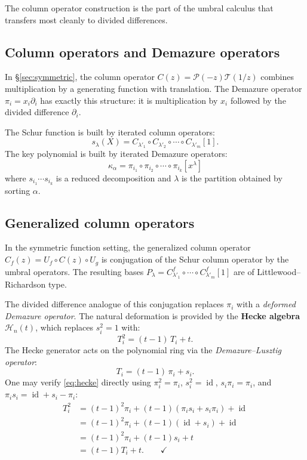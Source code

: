 \documentclass[11pt]{amsart}
\theoremstyle{definition}
\newcommand{\cT}{\mathcal{T}}
\newcommand{\cP}{\mathcal{P}}
\newcommand{\cH}{\mathcal{H}}
\DeclareMathOperator{\id}{id}
\begin{document}
The column operator construction is the part of the umbral calculus
that transfers most cleanly to divided differences.

\subsection{Column operators and Demazure operators}

In \S\ref{sec:symmetric}, the column operator $C(z) = \cP(-z)\cT(1/z)$
combines multiplication by a generating function with translation.
The Demazure operator $\pi_i = x_i \partial_i$ has exactly this
structure: it is multiplication by $x_i$ followed by the divided
difference $\partial_i$.

The Schur function is built by iterated column operators:
\[
  s_\lambda(X) = C_{\lambda'_1} \circ C_{\lambda'_2} \circ \cdots
  \circ C_{\lambda'_m}[1].
\]
The key polynomial is built by iterated Demazure operators:
\[
  \kappa_\alpha = \pi_{i_1} \circ \pi_{i_2} \circ \cdots \circ
  \pi_{i_k}[x^\lambda]
\]
where $s_{i_1} \cdots s_{i_k}$ is a reduced decomposition and
$\lambda$ is the partition obtained by sorting $\alpha$.

\subsection{Generalized column operators}

In the symmetric function setting, the generalized column operator
$C_f(z) = U_f \circ C(z) \circ U_g$ is conjugation of the Schur
column operator by the umbral operators. The resulting bases
$P_\lambda = C^f_{\lambda'_1} \circ \cdots \circ C^f_{\lambda'_m}[1]$
are of Littlewood--Richardson type.

The divided difference analogue of this conjugation replaces $\pi_i$
with a \emph{deformed Demazure operator}. The natural deformation
is provided by the \textbf{Hecke algebra} $\cH_n(t)$, which
replaces $s_i^2 = 1$ with:
\begin{equation}\label{eq:hecke}
  T_i^2 = (t - 1)\, T_i + t.
\end{equation}
The Hecke generator acts on the polynomial ring via the
\emph{Demazure--Lusztig operator}:
\begin{equation}\label{eq:DL}
  T_i = (t - 1)\, \pi_i + s_i.
\end{equation}
One may verify \eqref{eq:hecke} directly using $\pi_i^2 = \pi_i$,
$s_i^2 = \id$, $s_i \pi_i = \pi_i$, and
$\pi_i s_i = \id + s_i - \pi_i$:
\begin{align*}
  T_i^2 &= (t-1)^2 \pi_i + (t-1)(\pi_i s_i + s_i \pi_i) + \id \\
  &= (t-1)^2 \pi_i + (t-1)(\id + s_i) + \id \\
  &= (t-1)^2 \pi_i + (t-1) s_i + t \\
  &= (t-1) T_i + t. \qquad \checkmark
\end{align*}
\end{document}
